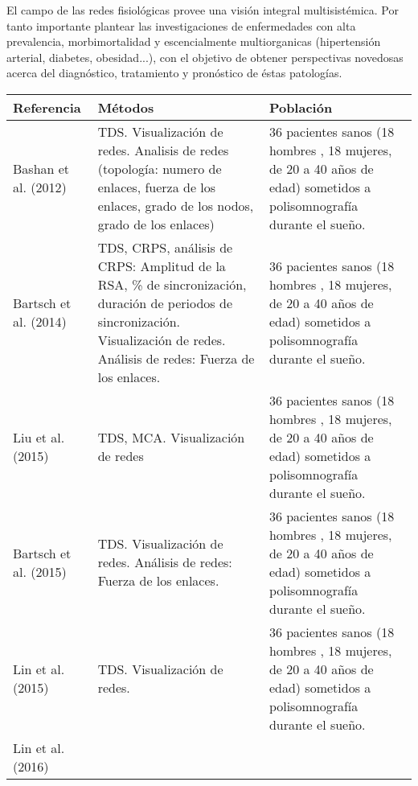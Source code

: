 \documentclass[twoside,twocolumn]{article}
\begin{document}
El campo de las redes fisiológicas provee una visión integral multisistémica.
Por tanto importante plantear las investigaciones de enfermedades con alta prevalencia, morbimortalidad y escencialmente multiorganicas (hipertensión arterial, diabetes, obesidad...), con el objetivo de obtener perspectivas novedosas acerca del diagnóstico, tratamiento y pronóstico de éstas patologías.

\onecolumn
\begin{center}
  \begin{longtable}{|p{}p{}p{}|}
    \hline
    \textbf{Referencia} & \textbf{Métodos} & \textbf{Población} \\
    \hline
    Bashan et al. (2012) \cite{bashan2012network} &
    TDS.
    Visualización de redes.
    Analisis de redes (topología: numero de enlaces, fuerza de los enlaces, grado de los nodos, grado de los enlaces)
    &
    36 pacientes sanos (18 hombres , 18 mujeres, de 20 a 40 años de edad) sometidos a polisomnografía durante el sueño.
    \\ \hline
    Bartsch et al. (2014)\cite{bartsch2014coexisting} &
    TDS, CRPS, análisis de CRPS: Amplitud de la RSA, \% de sincronización, duración de periodos de sincronización.
    Visualización de redes.
    Análisis de redes: Fuerza de los enlaces.
    &
    36 pacientes sanos (18 hombres , 18 mujeres, de 20 a 40 años de edad) sometidos a polisomnografía durante el sueño.
    \\ \hline
    Liu et al. (2015)\cite{liu2015major} &
    TDS, MCA.
    Visualización de redes
    &
    36 pacientes sanos (18 hombres , 18 mujeres, de 20 a 40 años de edad) sometidos a polisomnografía durante el sueño.
    \\ \hline
    Bartsch et al. (2015)\cite{bartsch2015network} &
    TDS.
    Visualización de redes.
    Análisis de redes: Fuerza de los enlaces.
    &
    36 pacientes sanos (18 hombres , 18 mujeres, de 20 a 40 años de edad) sometidos a polisomnografía durante el sueño.
    \\ \hline
    Lin et al. (2015) \cite{2015Plasticity} &
    TDS.
    Visualización de redes.
    &
    36 pacientes sanos (18 hombres , 18 mujeres, de 20 a 40 años de edad) sometidos a polisomnografía durante el sueño.
    \\ \hline
    Lin et al. (2016)\cite{lin2016delay} &

\end{longtable}
\end{center}
\end{document}
